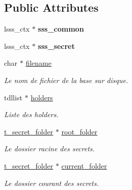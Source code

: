 \subsection*{Public Attributes}
\begin{DoxyCompactItemize}
\item 
\mbox{\label{classt__database_abe97f2a1efb635fb0915c184cc0a84bd}} 
lsss\+\_\+ctx $\ast$ {\bfseries sss\+\_\+common}
\item 
\mbox{\label{classt__database_a37a8ceaebb8603cec96cd3ee24f38561}} 
lsss\+\_\+ctx $\ast$ {\bfseries sss\+\_\+secret}
\item 
\mbox{\label{classt__database_af184c26218d74306d669fa972b6b3a17}} 
char $\ast$ \hyperlink{classt__database_af184c26218d74306d669fa972b6b3a17}{filename}
\begin{DoxyCompactList}\small\item\em Le nom de fichier de la base sur disque. \end{DoxyCompactList}\item 
\mbox{\label{classt__database_abe1bd02e8068b0febd1ba4fd467ae25e}} 
tdllist $\ast$ \hyperlink{classt__database_abe1bd02e8068b0febd1ba4fd467ae25e}{holders}
\begin{DoxyCompactList}\small\item\em Liste des holders. \end{DoxyCompactList}\item 
\mbox{\label{classt__database_add8b524bd4059f13263fa7064d09ad3c}} 
\hyperlink{classt__secret__folder}{t\+\_\+secret\+\_\+folder} $\ast$ \hyperlink{classt__database_add8b524bd4059f13263fa7064d09ad3c}{root\+\_\+folder}
\begin{DoxyCompactList}\small\item\em Le dossier racine des secrets. \end{DoxyCompactList}\item 
\mbox{\label{classt__database_aed115f085bed941b07459bd2039f4ddf}} 
\hyperlink{classt__secret__folder}{t\+\_\+secret\+\_\+folder} $\ast$ \hyperlink{classt__database_aed115f085bed941b07459bd2039f4ddf}{current\+\_\+folder}
\begin{DoxyCompactList}\small\item\em Le dossier courant des secrets. \end{DoxyCompactList}\item 

\end{DoxyCompactItemize}
